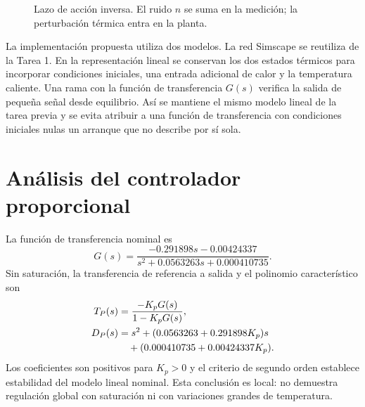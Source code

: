 \begin{figure}[!tbp]
\centering
{}
\caption{Lazo de acción inversa. El ruido $n$ se suma en la medición; la perturbación térmica entra en la planta.}
\label{fig:lazoP}
\end{figure}

La implementación propuesta utiliza dos modelos. La red Simscape se reutiliza de la Tarea 1. En la representación lineal se conservan los dos estados térmicos para incorporar condiciones iniciales, una entrada adicional de calor y la temperatura caliente. Una rama con la función de transferencia $G(s)$ verifica la salida de pequeña señal desde equilibrio. Así se mantiene el mismo modelo lineal de la tarea previa y se evita atribuir a una función de transferencia con condiciones iniciales nulas un arranque que no describe por sí sola.

\section{Análisis del controlador proporcional}
La función de transferencia nominal es
\begin{equation}
G(s)=\frac{-0.291898s-0.00424337}{s^2+0.0563263s+0.000410735}.
\end{equation}
Sin saturación, la transferencia de referencia a salida y el polinomio característico son
\begin{align}
 T_P(s)&=\frac{-K_pG(s)}{1-K_pG(s)},\\
 D_P(s)&=s^2+(0.0563263+0.291898K_p)s\notag\\
 &\quad +(0.000410735+0.00424337K_p).
\end{align}
Los coeficientes son positivos para $K_p>0$ y el criterio de segundo orden establece estabilidad del modelo lineal nominal. Esta conclusión es local: no demuestra regulación global con saturación ni con variaciones grandes de temperatura.

